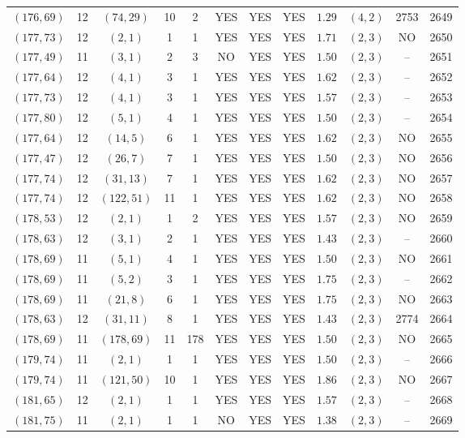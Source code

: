 \begin{longtable}{|c|c|c|c|c|c|c|c|c|c|c|c|}
$(176,69)$ & 12 & $(74,29)$ & 10 & 2 & YES & YES & YES & $1.29$ & $(4,2)$ & 2753 & 2649\\
$(177,73)$ & 12 & $(2,1)$ & 1 & 1 & YES & YES & YES & $1.71$ & $(2,3)$ & NO & 2650\\
$(177,49)$ & 11 & $(3,1)$ & 2 & 3 & NO & YES & YES & $1.50$ & $(2,3)$ & -- & 2651\\
$(177,64)$ & 12 & $(4,1)$ & 3 & 1 & YES & YES & YES & $1.62$ & $(2,3)$ & -- & 2652\\
$(177,73)$ & 12 & $(4,1)$ & 3 & 1 & YES & YES & YES & $1.57$ & $(2,3)$ & -- & 2653\\
$(177,80)$ & 12 & $(5,1)$ & 4 & 1 & YES & YES & YES & $1.50$ & $(2,3)$ & -- & 2654\\
$(177,64)$ & 12 & $(14,5)$ & 6 & 1 & YES & YES & YES & $1.62$ & $(2,3)$ & NO & 2655\\
$(177,47)$ & 12 & $(26,7)$ & 7 & 1 & YES & YES & YES & $1.50$ & $(2,3)$ & NO & 2656\\
$(177,74)$ & 12 & $(31,13)$ & 7 & 1 & YES & YES & YES & $1.62$ & $(2,3)$ & NO & 2657\\
$(177,74)$ & 12 & $(122,51)$ & 11 & 1 & YES & YES & YES & $1.62$ & $(2,3)$ & NO & 2658\\
$(178,53)$ & 12 & $(2,1)$ & 1 & 2 & YES & YES & YES & $1.57$ & $(2,3)$ & NO & 2659\\
$(178,63)$ & 12 & $(3,1)$ & 2 & 1 & YES & YES & YES & $1.43$ & $(2,3)$ & -- & 2660\\
$(178,69)$ & 11 & $(5,1)$ & 4 & 1 & YES & YES & YES & $1.50$ & $(2,3)$ & NO & 2661\\
$(178,69)$ & 11 & $(5,2)$ & 3 & 1 & YES & YES & YES & $1.75$ & $(2,3)$ & -- & 2662\\
$(178,69)$ & 11 & $(21,8)$ & 6 & 1 & YES & YES & YES & $1.75$ & $(2,3)$ & NO & 2663\\
$(178,63)$ & 12 & $(31,11)$ & 8 & 1 & YES & YES & YES & $1.43$ & $(2,3)$ & 2774 & 2664\\
$(178,69)$ & 11 & $(178,69)$ & 11 & 178 & YES & YES & YES & $1.50$ & $(2,3)$ & NO & 2665\\
$(179,74)$ & 11 & $(2,1)$ & 1 & 1 & YES & YES & YES & $1.50$ & $(2,3)$ & -- & 2666\\
$(179,74)$ & 11 & $(121,50)$ & 10 & 1 & YES & YES & YES & $1.86$ & $(2,3)$ & NO & 2667\\
$(181,65)$ & 12 & $(2,1)$ & 1 & 1 & YES & YES & YES & $1.57$ & $(2,3)$ & -- & 2668\\
$(181,75)$ & 11 & $(2,1)$ & 1 & 1 & NO & YES & YES & $1.38$ & $(2,3)$ & -- & 2669\\

\end{longtable}
